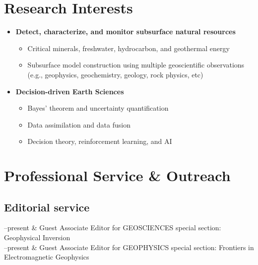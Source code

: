 \documentclass[11pt, a4paper]{article}
\newcommand{\Duration}[2]{\fontsize{10pt}{0}\selectfont #1--#2}
\begin{document}
\section*{Research Interests}
\begin{itemize}

	\item \textbf{Detect, characterize, and monitor subsurface natural resources}
	    \begin{itemize}
		\item Critical minerals, freshwater, hydrocarbon, and geothermal energy
		\item Subsurface model construction using multiple geoscientific observations (e.g., geophysics, geochemistry, geology, rock physics, etc)
		\end{itemize}

	\item \textbf{Decision-driven Earth Sciences}
 		\begin{itemize}
		\item Bayes’ theorem and uncertainty quantification
		\item Data assimilation and data fusion
		\item Decision theory, reinforcement learning, and AI
		\end{itemize}
		
\end{itemize}



\section*{Professional Service \& Outreach}

\subsection*{Editorial service}
\begin{EntriesTable}
	\Duration{2024}{present}  &
	Guest Associate Editor for GEOSCIENCES special section: Geophysical Inversion
	\\
	\Duration{2023}{present}  &
	Guest Associate Editor for GEOPHYSICS special section: Frontiers in Electromagnetic Geophysics
\end{EntriesTable}
\end{document}

